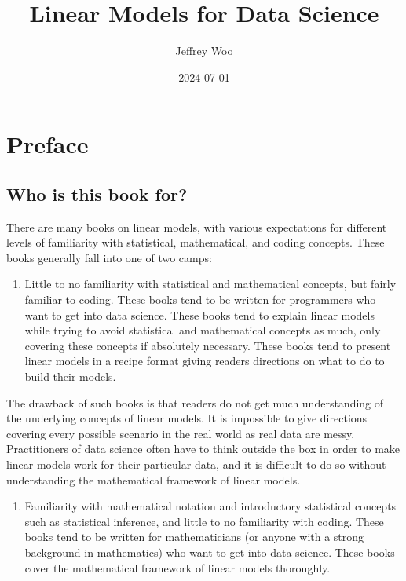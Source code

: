 \documentclass[
]{book}
\title{Linear Models for Data Science}
\author{Jeffrey Woo}
\date{2024-07-01}
\providecommand{\tightlist}{%
  \setlength{\itemsep}{0pt}\setlength{\parskip}{0pt}}
\begin{document}
\maketitle

{
\setcounter{tocdepth}{1}
\tableofcontents
}
\hypertarget{preface}{%
\chapter*{Preface}\label{preface}}

\hypertarget{who-is-this-book-for}{%
\section*{Who is this book for?}\label{who-is-this-book-for}}

There are many books on linear models, with various expectations for different levels of familiarity with statistical, mathematical, and coding concepts. These books generally fall into one of two camps:

\begin{enumerate}
\def\labelenumi{\arabic{enumi}.}
\tightlist
\item
  Little to no familiarity with statistical and mathematical concepts, but fairly familiar to coding. These books tend to be written for programmers who want to get into data science. These books tend to explain linear models while trying to avoid statistical and mathematical concepts as much, only covering these concepts if absolutely necessary. These books tend to present linear models in a recipe format giving readers directions on what to do to build their models.
\end{enumerate}

The drawback of such books is that readers do not get much understanding of the underlying concepts of linear models. It is impossible to give directions covering every possible scenario in the real world as real data are messy. Practitioners of data science often have to think outside the box in order to make linear models work for their particular data, and it is difficult to do so without understanding the mathematical framework of linear models.

\begin{enumerate}
\def\labelenumi{\arabic{enumi}.}
\setcounter{enumi}{1}
\tightlist
\item
  Familiarity with mathematical notation and introductory statistical concepts such as statistical inference, and little to no familiarity with coding. These books tend to be written for mathematicians (or anyone with a strong background in mathematics) who want to get into data science. These books cover the mathematical framework of linear models thoroughly.
\end{enumerate}
\end{document}
